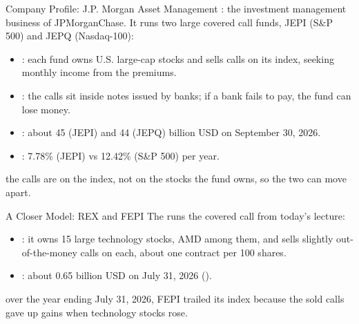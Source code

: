 \documentclass[aspectratio=169,11pt]{beamer}
\begin{document}
\begin{frame}{Company Profile: J.P. Morgan Asset Management}
  \href{https://am.jpmorgan.com/us/en/asset-management/adv/}{}:
  the investment management business of JPMorganChase. It runs two large covered
  call funds, JEPI (S\&P 500) and JEPQ (Nasdaq-100):
  \begin{itemize}\setlength{\itemsep}{0.4em}
    \item {}: each fund owns U.S. large-cap stocks
      and sells calls on its index, seeking monthly income from the premiums.
    \item {}: the calls sit inside notes issued by
      banks; if a bank fails to pay, the fund can lose money.
    \item {}: about 45 (JEPI) and 44 (JEPQ) billion USD on September
      30, 2026.
    \item {}: 7.78\% (JEPI) vs 12.42\% (S\&P 500) per year.
  \end{itemize}
  \vspace{0.3em}
  \textbf{} the calls are on the index, not on the stocks the
  fund owns, so the two can move apart.
\end{frame}

\begin{frame}{A Closer Model: REX and FEPI}
  The \href{https://www.rexshares.com/rex-covered-call-etfs/}{} runs the covered call from today's lecture:
  \begin{itemize}\setlength{\itemsep}{0.4em}
    \item {}: it owns 15 large
      technology stocks, AMD among them, and sells slightly out-of-the-money
      calls on each, about one contract per 100 shares.
    \item {}: about 0.65 billion USD on July 31, 2026
      (\href{https://www.sec.gov/Archives/edgar/data/1771146/000199937126021985/fepi-ncsr_073126.htm}{}).
  \end{itemize}
  \vspace{0.3em}
  \textbf{} over the year ending July 31, 2026, FEPI trailed its
  index because the sold calls gave up gains when technology stocks rose.
\end{frame}
\end{document}
